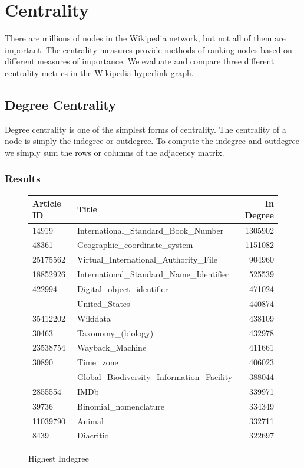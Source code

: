 \documentclass{article}
\begin{document}
\section{Centrality}

There are millions of nodes in the Wikipedia network, but not all of them are important.
The centrality measures provide methods of ranking nodes based on different measures of importance.
We evaluate and compare three different centrality metrics in the Wikipedia hyperlink graph.

\subsection{Degree Centrality}

Degree centrality is one of the simplest forms of centrality. The centrality of a node is simply the indegree or outdegree.
To compute the indegree and outdegree we simply sum the rows or columns of the adjacency matrix.

\subsubsection{Results}
\begin{figure}[H]
    \centering
    \caption{Highest Indegree}
    \begin{tabular}{llr}
        \toprule
        Article ID & Title & In Degree\\
        \midrule
        14919 & International\_Standard\_Book\_Number & 1305902\\
        48361 & Geographic\_coordinate\_system & 1151082\\
        25175562 & Virtual\_International\_Authority\_File & 904960\\
        18852926 & International\_Standard\_Name\_Identifier & 525539\\
        422994 & Digital\_object\_identifier & 471024\\
        \addlinespace
        3434750 & United\_States & 440874\\
        35412202 & Wikidata & 438109\\
        30463 & Taxonomy\_(biology) & 432978\\
        23538754 & Wayback\_Machine & 411661\\
        30890 & Time\_zone & 406023\\
        \addlinespace
        2987862 & Global\_Biodiversity\_Information\_Facility & 388044\\
        2855554 & IMDb & 339971\\
        39736 & Binomial\_nomenclature & 334349\\
        11039790 & Animal & 332711\\
        8439 & Diacritic & 322697\\
        \bottomrule
    \end{tabular}
\end{figure}
    
\end{document}
